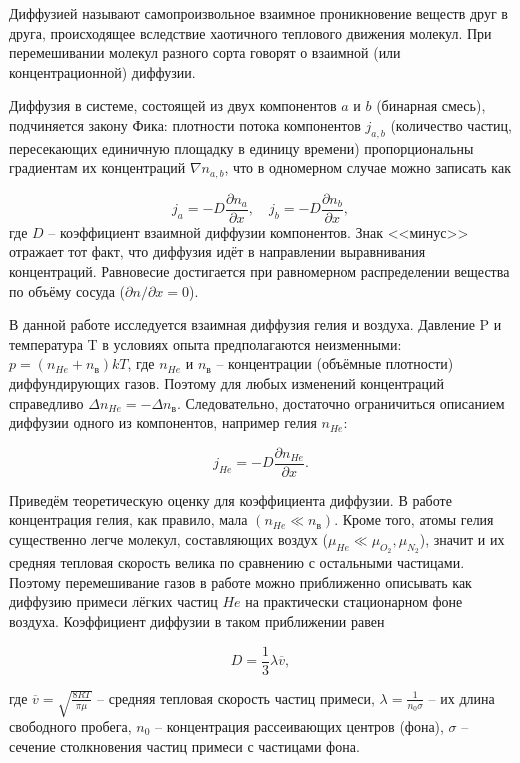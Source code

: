 \documentclass[a4paper,12pt]{article} %
\begin{document}
Диффузией называют самопроизвольное взаимное проникновение веществ друг в друга, происходящее вследствие хаотичного теплового движения молекул. При перемешивании молекул разного сорта говорят о взаимной (или концентрационной) диффузии.

Диффузия в системе, состоящей из двух компонентов $ a $ и $ b $ (бинарная смесь), подчиняется закону Фика: плотности потока компонентов $ j_{a,b} $ (количество частиц, пересекающих единичную площадку в единицу времени) пропорциональны градиентам их концентраций $ \nabla n_{a,b}$, что в одномерном случае можно записать как

\[ j_a = -D\frac{\partial n_a}{\partial x}, \quad j_b = -D\frac{\partial n_b}{\partial x}, \]
где $ D $ -- коэффициент взаимной диффузии компонентов. Знак <<минус>> отражает тот факт, что диффузия идёт в направлении выравнивания концентраций. Равновесие достигается при равномерном распределении вещества по объёму сосуда ($ \partial n / \partial x = 0 $).

В данной работе исследуется взаимная диффузия гелия и воздуха. Давление P и температура T в условиях опыта предполагаются неизменными: $ p=(n_{He}+n_{\text{в}})kT $, где $ n_{He} $ и $ n_{\text{в}} $ -- концентрации (объёмные плотности) диффундирующих газов. Поэтому для любых изменений концентраций справедливо $ \Delta n_{He}=-\Delta n_{\text{в}} $. Следовательно, достаточно ограничиться описанием диффузии одного из компонентов, например гелия $ n_{He} $:

\begin{equation}\label{1}
j_{He}=-D\frac{\partial n_{He}}{\partial x}.
\end{equation}

Приведём теоретическую оценку для коэффициента диффузии. В работе концентрация гелия, как правило, мала $ (n_{He} \ll n_\text{в}) $. Кроме того, атомы гелия существенно легче молекул, составляющих воздух ($ \mu_{He} \ll \mu_{O_2}, \mu_{N_2} $), значит и их средняя тепловая скорость велика по сравнению с остальными частицами. Поэтому перемешивание газов в работе можно приближенно описывать как диффузию примеси лёгких частиц $ He $ на практически стационарном фоне воздуха. Коэффициент диффузии в таком приближении равен

\begin{equation}\label{2}
D=\frac{1}{3}\lambda \overline{v},
\end{equation}

где $ \overline{v}=\sqrt{\frac{8RT}{\pi \mu}} $ -- средняя тепловая скорость частиц примеси, $ \lambda = \frac{1}{n_0\sigma} $ -- их длина свободного пробега, $ n_0 $ -- концентрация рассеивающих центров (фона), $ \sigma $ -- сечение столкновения частиц примеси с частицами фона.
\end{document}
